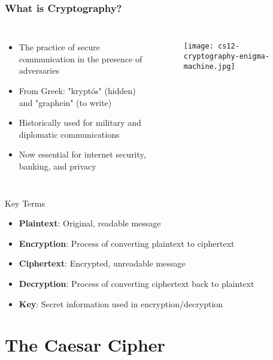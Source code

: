 \documentclass{beamer}
\begin{document}
\begin{frame}
    \frametitle{What is Cryptography?}
    \begin{columns}
    \begin{itemize}
        \item The practice of secure communication in the presence of adversaries
        \item From Greek: "kryptós" (hidden) and "graphein" (to write)
        \item Historically used for military and diplomatic communications
        \item Now essential for internet security, banking, and privacy
    \end{itemize}
    
    \begin{figure}
        \centering
        \texttt{[image: cs12-cryptography-enigma-machine.jpg]}
    \end{figure}
    \end{columns}
    
    \begin{block}{Key Terms}
        \begin{itemize}
            \item \textbf{Plaintext}: Original, readable message
            \item \textbf{Encryption}: Process of converting plaintext to ciphertext
            \item \textbf{Ciphertext}: Encrypted, unreadable message
            \item \textbf{Decryption}: Process of converting ciphertext back to plaintext
            \item \textbf{Key}: Secret information used in encryption/decryption
        \end{itemize}
    \end{block}
\end{frame}

\section{The Caesar Cipher}
\end{document}
